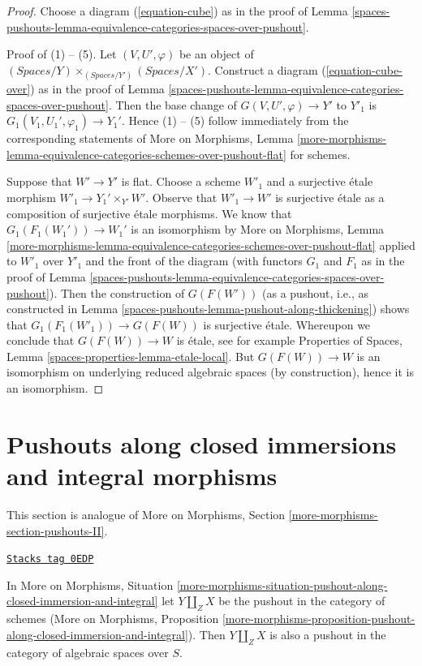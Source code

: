 \begin{proof}
Choose a diagram (\ref{equation-cube}) as in the proof of
Lemma \ref{spaces-pushouts-lemma-equivalence-categories-spaces-over-pushout}.

\medskip\noindent
Proof of (1) -- (5). Let $(V, U', \varphi)$ be an object of
$(\textit{Spaces}/Y) \times_{(\textit{Spaces}/Y')} (\textit{Spaces}/X')$.
Construct a diagram (\ref{equation-cube-over}) as in the proof of
Lemma \ref{spaces-pushouts-lemma-equivalence-categories-spaces-over-pushout}.
Then the base change of $G(V, U', \varphi) \to Y'$ to
$Y'_1$ is $G_1(V_1, U_1', \varphi_1) \to Y_1'$. Hence (1) -- (5)
follow immediately from the corresponding statements of
More on Morphisms, Lemma
\ref{more-morphisms-lemma-equivalence-categories-schemes-over-pushout-flat}
for schemes.

\medskip\noindent
Suppose that $W' \to Y'$ is flat. Choose a scheme $W'_1$ and a surjective
\'etale morphism $W'_1 \to Y_1' \times_{Y'} W'$. Observe that $W'_1 \to W'$
is surjective \'etale as a composition of surjective \'etale morphisms. We
know that $G_1(F_1(W_1')) \to W_1'$ is an isomorphism by
More on Morphisms, Lemma
\ref{more-morphisms-lemma-equivalence-categories-schemes-over-pushout-flat}
applied to $W'_1$ over $Y'_1$ and the front of the diagram (with functors
$G_1$ and $F_1$ as in the proof of
Lemma \ref{spaces-pushouts-lemma-equivalence-categories-spaces-over-pushout}).
Then the construction of $G(F(W'))$ (as a pushout, i.e.,
as constructed in Lemma \ref{spaces-pushouts-lemma-pushout-along-thickening}) shows that
$G_1(F_1(W'_1)) \to G(F(W))$ is surjective \'etale. Whereupon we conclude
that $G(F(W)) \to W$ is \'etale, see for example
Properties of Spaces, Lemma \ref{spaces-properties-lemma-etale-local}.
But $G(F(W)) \to W$ is an isomorphism on underlying reduced
algebraic spaces (by construction), hence it is an isomorphism.
\end{proof}

\section{Pushouts along closed immersions and integral morphisms}
\label{spaces-pushouts-section-pushouts-II}
This section is analogue of
More on Morphisms, Section \ref{more-morphisms-section-pushouts-II}.

\begin{lemma}
\label{spaces-pushouts-lemma-pushout-along-closed-immersion-and-integral}
\href{https://stacks.math.columbia.edu/tag/0EDP}{\texttt{Stacks tag 0EDP}}

In More on Morphisms, Situation
\ref{more-morphisms-situation-pushout-along-closed-immersion-and-integral}
let $Y \amalg_Z X$ be the pushout in the category of schemes
(More on Morphisms, Proposition
\ref{more-morphisms-proposition-pushout-along-closed-immersion-and-integral}).
Then $Y \amalg_Z X$
is also a pushout in the category of algebraic spaces over $S$.
\end{lemma}

